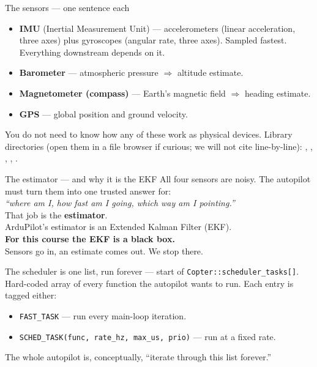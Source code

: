 \documentclass[aspectratio=169,11pt]{beamer}
\begin{document}
\begin{frame}{The sensors --- one sentence each}
  \begin{itemize}
    \item \textbf{IMU} (Inertial Measurement Unit) --- accelerometers (linear acceleration, three axes) plus gyroscopes (angular rate, three axes). Sampled fastest. Everything downstream depends on it.
    \item \textbf{Barometer} --- atmospheric pressure $\Rightarrow$ altitude estimate.
    \item \textbf{Magnetometer (compass)} --- Earth's magnetic field $\Rightarrow$ heading estimate.
    \item \textbf{GPS} --- global position and ground velocity.
  \end{itemize}
  You do not need to know how any of these work as physical devices.
  \vfill
  Library directories (open them in a file browser if curious; we will not cite line-by-line):
  , , , , .
\end{frame}

\begin{frame}{The estimator --- and why it is the EKF}
  All four sensors are noisy. The autopilot must turn them into one trusted answer for:\\
  \emph{``where am I, how fast am I going, which way am I pointing.''}\\[1ex]
  That job is the \textbf{estimator}.\\[1ex]
  ArduPilot's estimator is an Extended Kalman Filter (EKF).\\[1ex]
  \textbf{For this course the EKF is a black box.}\\
  Sensors go in, an estimate comes out. We stop there.
\end{frame}

\begin{frame}{The scheduler is one list, run forever}
   --- start of \texttt{Copter::scheduler\_tasks[]}.\\[1ex]
  Hard-coded array of every function the autopilot wants to run. Each entry is tagged either:
  \begin{itemize}
    \item \texttt{FAST\_TASK} --- run every main-loop iteration.
    \item \texttt{SCHED\_TASK(func, rate\_hz, max\_us, prio)} --- run at a fixed rate.
  \end{itemize}
  The whole autopilot is, conceptually, ``iterate through this list forever.''
\end{frame}
\end{document}
